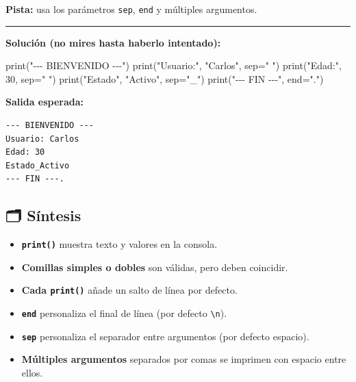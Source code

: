 \documentclass[
  doc,
  floatsintext,
  longtable,
  a4paper,
  nolmodern,
  notxfonts,
  notimes,
  12pt,
  colorlinks=true,linkcolor=blue,citecolor=blue,urlcolor=blue]{apa7}
\newenvironment{Shaded}{\begin{snugshade}}{\end{snugshade}}
\newcommand{\BuiltInTok}[1]{\textcolor[rgb]{0.00,0.23,0.31}{#1}}
\newcommand{\DecValTok}[1]{\textcolor[rgb]{0.68,0.00,0.00}{#1}}
\newcommand{\NormalTok}[1]{\textcolor[rgb]{0.00,0.23,0.31}{#1}}
\newcommand{\OperatorTok}[1]{\textcolor[rgb]{0.37,0.37,0.37}{#1}}
\newcommand{\StringTok}[1]{\textcolor[rgb]{0.13,0.47,0.30}{#1}}
\providecommand{\tightlist}{%
  \setlength{\itemsep}{0pt}\setlength{\parskip}{0pt}}
\begin{document}
\textbf{Pista:} usa los parámetros \texttt{sep}, \texttt{end} y
múltiples argumentos.

\begin{center}\rule{0.5\linewidth}{0.5pt}\end{center}

\textbf{Solución (no mires hasta haberlo intentado):}

\begin{Shaded}
\begin{Highlighting}[]
\BuiltInTok{print}\NormalTok{(}\StringTok{"{-}{-}{-} BIENVENIDO {-}{-}{-}"}\NormalTok{)}
\BuiltInTok{print}\NormalTok{(}\StringTok{"Usuario:"}\NormalTok{, }\StringTok{"Carlos"}\NormalTok{, sep}\OperatorTok{=}\StringTok{" "}\NormalTok{)}
\BuiltInTok{print}\NormalTok{(}\StringTok{"Edad:"}\NormalTok{, }\DecValTok{30}\NormalTok{, sep}\OperatorTok{=}\StringTok{" "}\NormalTok{)}
\BuiltInTok{print}\NormalTok{(}\StringTok{"Estado"}\NormalTok{, }\StringTok{"Activo"}\NormalTok{, sep}\OperatorTok{=}\StringTok{"\_"}\NormalTok{)}
\BuiltInTok{print}\NormalTok{(}\StringTok{"{-}{-}{-} FIN {-}{-}{-}"}\NormalTok{, end}\OperatorTok{=}\StringTok{"."}\NormalTok{)}
\end{Highlighting}
\end{Shaded}

\textbf{Salida esperada:}

\begin{verbatim}
--- BIENVENIDO ---
Usuario: Carlos
Edad: 30
Estado_Activo
--- FIN ---.
\end{verbatim}

\subsection{🗂️ Síntesis}\label{suxedntesis}

\begin{itemize}
\tightlist
\item
  \textbf{\texttt{print()}} muestra texto y valores en la consola.
\item
  \textbf{Comillas simples o dobles} son válidas, pero deben coincidir.
\item
  \textbf{Cada \texttt{print()}} añade un salto de línea por defecto.
\item
  \textbf{\texttt{end}} personaliza el final de línea (por defecto
  \texttt{\textbackslash{}n}).
\item
  \textbf{\texttt{sep}} personaliza el separador entre argumentos (por
  defecto espacio).
\item
  \textbf{Múltiples argumentos} separados por comas se imprimen con
  espacio entre ellos.
\end{itemize}
\end{document}
